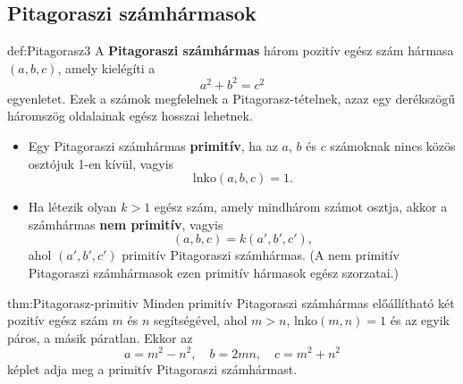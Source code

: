 \subsection*{Pitagoraszi számhármasok}
\begin{definition}{def:Pitagorasz3}
A \textbf{Pitagoraszi számhármas} három pozitív egész szám hármasa
$(a,b,c)$, amely kielégíti a
\[
a^{2}+b^{2}=c^{2}
\]
egyenletet. Ezek a számok megfelelnek a Pitagorasz-tételnek, azaz
egy derékszögű háromszög oldalainak egész hosszai lehetnek.
\begin{itemize}
\item Egy Pitagoraszi számhármas \textbf{primitív}, ha az $a$, $b$ és
$c$ számoknak nincs közös osztójuk 1-en kívül, vagyis
\[
\mathrm{lnko}(a,b,c)=1.
\]
\item Ha létezik olyan $k>1$ egész szám, amely mindhárom számot osztja,
akkor a számhármas \textbf{nem primitív}, vagyis
\[
(a,b,c)=k(a',b',c'),
\]
ahol $(a',b',c')$ primitív Pitagoraszi számhármas. (A nem primitív
Pitagoraszi számhármasok ezen primitív hármasok egész szorzatai.) 
\end{itemize}
\end{definition}

\begin{theorem}{thm:Pitagorasz-primitiv}
Minden primitív Pitagoraszi számhármas előállítható két pozitív egész
szám $m$ és $n$ segítségével, ahol $m>n$, $\mathrm{lnko}(m,n)=1$
és az egyik páros, a másik páratlan. Ekkor az
\[
a=m^{2}-n^{2},\quad b=2mn,\quad c=m^{2}+n^{2}
\]
képlet adja meg a primitív Pitagoraszi számhármast. 
\end{theorem}

